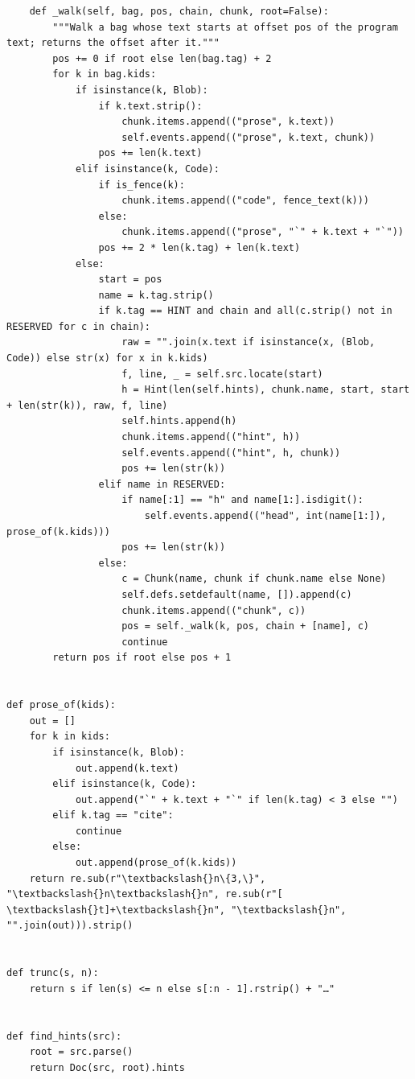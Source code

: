 \documentclass[10pt,a4paper]{article}
\newcounter{chunk}
\begin{document}
\begin{Verbatim}
    def _walk(self, bag, pos, chain, chunk, root=False):
        """Walk a bag whose text starts at offset pos of the program text; returns the offset after it."""
        pos += 0 if root else len(bag.tag) + 2
        for k in bag.kids:
            if isinstance(k, Blob):
                if k.text.strip():
                    chunk.items.append(("prose", k.text))
                    self.events.append(("prose", k.text, chunk))
                pos += len(k.text)
            elif isinstance(k, Code):
                if is_fence(k):
                    chunk.items.append(("code", fence_text(k)))
                else:
                    chunk.items.append(("prose", "`" + k.text + "`"))
                pos += 2 * len(k.tag) + len(k.text)
            else:
                start = pos
                name = k.tag.strip()
                if k.tag == HINT and chain and all(c.strip() not in RESERVED for c in chain):
                    raw = "".join(x.text if isinstance(x, (Blob, Code)) else str(x) for x in k.kids)
                    f, line, _ = self.src.locate(start)
                    h = Hint(len(self.hints), chunk.name, start, start + len(str(k)), raw, f, line)
                    self.hints.append(h)
                    chunk.items.append(("hint", h))
                    self.events.append(("hint", h, chunk))
                    pos += len(str(k))
                elif name in RESERVED:
                    if name[:1] == "h" and name[1:].isdigit():
                        self.events.append(("head", int(name[1:]), prose_of(k.kids)))
                    pos += len(str(k))
                else:
                    c = Chunk(name, chunk if chunk.name else None)
                    self.defs.setdefault(name, []).append(c)
                    chunk.items.append(("chunk", c))
                    pos = self._walk(k, pos, chain + [name], c)
                    continue
        return pos if root else pos + 1


def prose_of(kids):
    out = []
    for k in kids:
        if isinstance(k, Blob):
            out.append(k.text)
        elif isinstance(k, Code):
            out.append("`" + k.text + "`" if len(k.tag) < 3 else "")
        elif k.tag == "cite":
            continue
        else:
            out.append(prose_of(k.kids))
    return re.sub(r"\textbackslash{}n\{3,\}", "\textbackslash{}n\textbackslash{}n", re.sub(r"[ \textbackslash{}t]+\textbackslash{}n", "\textbackslash{}n", "".join(out))).strip()


def trunc(s, n):
    return s if len(s) <= n else s[:n - 1].rstrip() + "…"


def find_hints(src):
    root = src.parse()
    return Doc(src, root).hints
\end{Verbatim}
\end{document}
